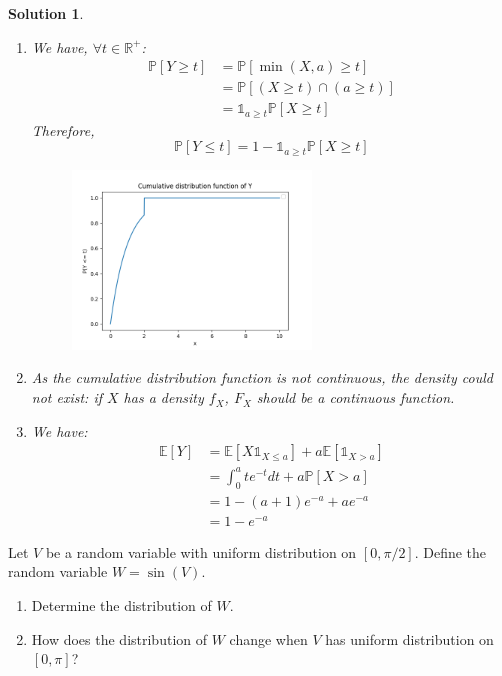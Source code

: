 \documentclass{article}
\newcommand{\proba}[1]{\mathbb{P}[#1]}
\newcommand{\esperance}[1]{\mathbb{E}[#1]}
\newcommand{\indicator}[1]{\mathbb{1}_{#1}}
\newcommand{\R}{\mathbb{R}}
\newtheorem{solution}{Solution}
\begin{document}
\begin{solution}
  \begin{enumerate}
    \item We have, $\forall t \in \R^+$:
          \begin{align*}
            \proba{Y \geq t} & = \proba{\min(X, a) \geq t}             \\
                             & = \proba{(X \geq t) \cap (a \geq t)}    \\
                             & = \indicator{a \geq t} \proba{X \geq t}
          \end{align*}
          Therefore,
          \[
            \proba{Y \leq t} = 1 - \indicator{a \geq t} \proba{X \geq t}
          \]
          \begin{figure}[h]
            \centering
            \includegraphics[width=0.6\textwidth]{cdf.png}
          \end{figure}
    \item As the cumulative distribution function is not continuous, the density could not exist: if $X$ has a density $f_X$, $F_X$ should be a continuous function.
    \item We have:
          \begin{align*}
            \esperance{Y} & = \esperance{X \mathbb{1}_{X \leq a} } + a \esperance{\mathbb{1}_{X>a}} \\
                          & = \int_0^a t e^{-t} dt + a \proba{X > a}                                \\
                          & = 1 - (a+1) e^{-a} + a e^{-a}                                           \\
                          & = 1 - e^{-a}
          \end{align*}
  \end{enumerate}
\end{solution}

\begin{Exercise} Let $V$ be a random variable with uniform distribution on $[0, \pi / 2]$. Define the random variable $W=\sin (V)$.
  \begin{enumerate}
    \item Determine the distribution of $W$.
    \item How does the distribution of $W$ change when $V$ has uniform distribution on $[0, \pi]$?
  \end{enumerate}
\end{Exercise}
\end{document}
